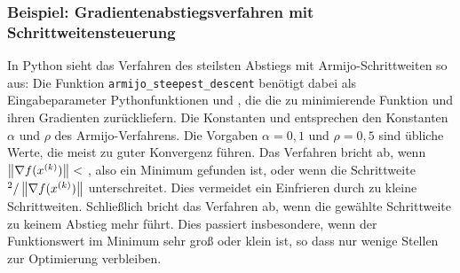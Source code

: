 \subsubsection{Beispiel: Gradientenabstiegsverfahren mit
  Schrittweitensteuerung}
\label{sec:armijosd}

In Python sieht das Verfahren des steilsten Abstiegs mit
Armijo-Schrittweiten so aus:
%
Die Funktion \lstinline!armijo_steepest_descent! benötigt dabei als
Eingabeparameter Pythonfunktionen  und , die die
zu minimierende Funktion und ihren Gradienten zurückliefern. Die
Konstanten  und  entsprechen den Konstanten
$\alpha$ und $\rho$ des Armijo-Verfahrens. Die Vorgaben $\alpha=0,1$
und $\rho=0,5$ sind übliche Werte, die meist zu guter Konvergenz
führen. Das Verfahren bricht ab, wenn $\left\lVert{\nabla f(x^{(k)})}\right\rVert<$
, also ein Minimum gefunden ist, oder wenn die Schrittweite
$^2/\left\lVert{\nabla f(x^{(k)})}\right\rVert$ unterschreitet. Dies vermeidet
ein Einfrieren durch zu kleine Schrittweiten. Schließlich bricht das
Verfahren ab, wenn die gewählte Schrittweite zu keinem Abstieg mehr
führt. Dies passiert insbesondere, wenn der Funktionswert im Minimum
sehr groß oder klein ist, so dass nur wenige Stellen zur Optimierung
verbleiben.


